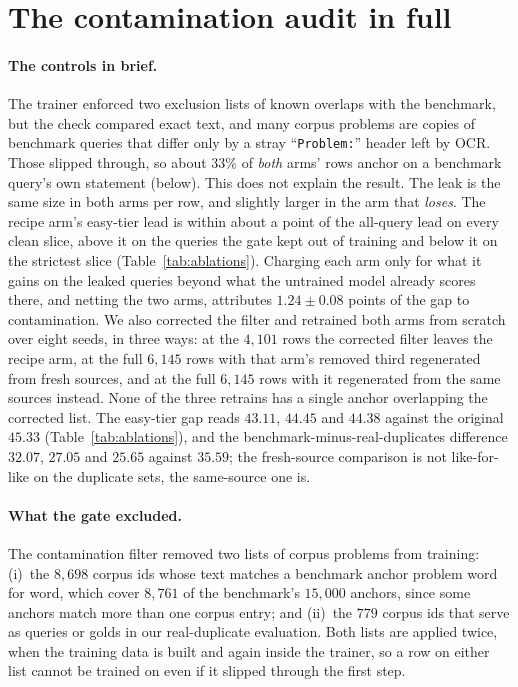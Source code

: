 \section{The contamination audit in full}
\label{app:contamination}

\paragraph{The controls in brief.}\label{sec:contamination}
The trainer enforced two exclusion lists of known overlaps with the benchmark, but the check compared exact text, and many corpus problems are copies of benchmark queries that differ only by a stray ``\texttt{Problem:}'' header left by OCR. Those slipped through, so about $33\%$ of \emph{both} arms' rows anchor on a benchmark query's own statement (below). This does not explain the result. The leak is the same size in both arms per row, and slightly larger in the arm that \emph{loses}. The recipe arm's easy-tier lead is within about a point of the all-query lead on every clean slice, above it on the queries the gate kept out of training and below it on the strictest slice (Table~\ref{tab:ablations}). Charging each arm only for what it gains on the leaked queries beyond what the untrained model already scores there, and netting the two arms, attributes $1.24 \pm 0.08$ points of the gap to contamination. We also corrected the filter and retrained both arms from scratch over eight seeds, in three ways: at the $4{,}101$ rows the corrected filter leaves the recipe arm, at the full $6{,}145$ rows with that arm's removed third regenerated from fresh sources, and at the full $6{,}145$ rows with it regenerated from the same sources instead. None of the three retrains has a single anchor overlapping the corrected list. The easy-tier gap reads $43.11$, $44.45$ and $44.38$ against the original $45.33$ (Table~\ref{tab:ablations}), and the benchmark-minus-real-duplicates difference $32.07$, $27.05$ and $25.65$ against $35.59$; the fresh-source comparison is not like-for-like on the duplicate sets, the same-source one is.

\paragraph{What the gate excluded.}The contamination filter removed two lists of corpus problems from training: (i)~the $8{,}698$ corpus ids whose text matches a benchmark anchor problem word for word, which cover $8{,}761$ of the benchmark's $15{,}000$ anchors, since some anchors match more than one corpus entry; and (ii)~the $779$ corpus ids that serve as queries or golds in our real-duplicate evaluation. Both lists are applied twice, when the training data is built and again inside the trainer, so a row on either list cannot be trained on even if it slipped through the first step.

